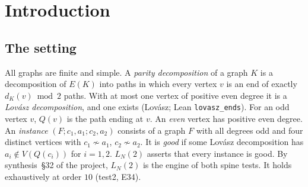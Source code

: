 \documentclass[11pt]{amsart}
\theoremstyle{definition}
\begin{document}
\begin{abstract}
\begin{itemize}
(Proposition~\ref{prop:leafhead}): avoiding the even vertex, the case $A=\{g\}$ of $L_1^*$. AE holds exhaustively for $n\le9$ and on $292{,}838$ derived instances of order $10$.
\item \emph{The residual.} The proved conditions cover $396$ of $428$ instances at order $6$, $41{,}047$
of $43{,}400$ at order $8$, and $2{,}926$ of the $3{,}000$ sampled at order $10$. We list the residual by
type and give the smallest examples (orders $6$ and $8$). At orders $6$ and $8$ and on the order-$10$
sample, every residual instance has an executed Criterion R certificate. At order $10$ every instance
has an exact or executed certificate: Conjecture~J at the joined instances; Corollary~B,
Theorem~\ref{thm:G}, AE or Criterion R at the separated ones.
\item \emph{$m=3$} (computed). $L_N(3)$ holds at all $84{,}064$ instances of order $8$ ($F$
connected). The natural joint extension fails at $84$ of them. Criterion R3, which pre-commits one
joint path or two end paths, certifies all $84{,}064$ instances; every certificate was executed.
\end{itemize}
\end{abstract}
\maketitle

\section{Introduction}\label{sec:intro}

\subsection*{The setting}
All graphs are finite and simple. A \emph{parity decomposition} of a graph $K$ is a decomposition of
$E(K)$ into paths in which every vertex $v$ is an end of exactly $d_K(v)\bmod 2$ paths. With at
most one vertex of positive even degree it is a \emph{Lov\'asz decomposition}, and one exists
(Lov\'asz; Lean \texttt{lovasz\_ends}). For an odd vertex $v$, $Q(v)$ is the path ending at $v$.
An \emph{even} vertex has positive even degree. An \emph{instance} $(F;c_1,a_1;c_2,a_2)$ consists of
a graph $F$ with all degrees odd and four distinct vertices with $c_1\not\sim a_1$,
$c_2\not\sim a_2$. It is \emph{good} if some Lov\'asz decomposition has $a_i\notin V(Q(c_i))$ for
$i=1,2$. $L_N(2)$ asserts that every instance is good. By synthesis~\S32 of the project, $L_N(2)$ is the engine of
both spine tests. It holds exhaustively at order $10$ (test2, E34).
\end{document}
